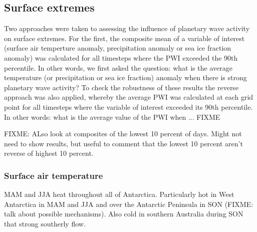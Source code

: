 \subsection{Surface extremes}

Two approaches were taken to assessing the influence of planetary wave activity on surface extremes. For the first, the composite mean of a variable of interest (surface air temperture anomaly, precipitation anomaly or sea ice fraction anomaly) was calculated for all timesteps where the PWI exceeded the 90th percentile. In other words, we first asked the question: what is the average temperature (or precipitation or sea ice fraction) anomaly when there is strong planetary wave activity? To check the robustness of these results the reverse approach was also applied, whereby the average PWI was calculated at each grid point for all timesteps where the variable of interest exceeded its 90th percentile. In other words: what is the average value of the PWI when ... FIXME

FIXME: ALso look at composites of the lowest 10 percent of days. Might not need to show results, but useful to comment that the lowest 10 percent aren't reverse of highest 10 percent.

\subsubsection{Surface air temperature}

MAM and JJA heat throughout all of Antarctica. Particularly hot in West Antarctica in MAM and JJA and over the Antarctic Peninsula in SON (FIXME: talk about possible mechanisms). Also cold in southern Australia during SON that strong southerly flow.


